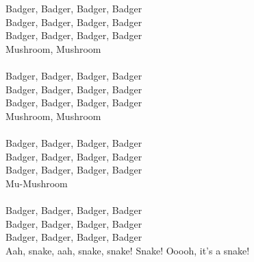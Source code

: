 \vspace{10pt}
Badger, Badger, Badger, Badger\\
Badger, Badger, Badger, Badger\\
Badger, Badger, Badger, Badger\\
Mushroom, Mushroom\\
\\
Badger, Badger, Badger, Badger\\
Badger, Badger, Badger, Badger\\
Badger, Badger, Badger, Badger\\
Mushroom, Mushroom\\
\\
Badger, Badger, Badger, Badger\\
Badger, Badger, Badger, Badger\\
Badger, Badger, Badger, Badger\\
Mu-Mushroom\\
\\
Badger, Badger, Badger, Badger\\
Badger, Badger, Badger, Badger\\
Badger, Badger, Badger, Badger\\
Aah, snake, aah, snake, snake! Snake! Ooooh, it's a snake!
